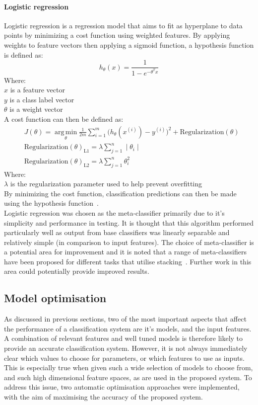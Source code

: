 \documentclass[titlepage, 12pt]{scrartcl} \usepackage{enumitem}
\DeclareMathOperator*{\argmin}{arg\,min}
\begin{document}
\paragraph{Logistic regression}
Logistic regression is a regression model that aims to fit as hyperplane to
data points by minimizing a cost function using weighted features.
By applying weights to feature vectors then applying a sigmoid function, a
hypothesis function is defined as:
\begin{equation}
    h_\theta(x)=\frac{1}{1-e^{-\theta^{T}x}}
\end{equation}
Where:\\
$x$ is a feature vector\\
$y$ is a class label vector \\
$\theta$ is a weight vector \\
A cost function can then be defined as:
\begin{align}
    &J(\theta)=\argmin\limits_\theta\frac{1}{2m}\sum\limits_{i=1}^m\Big(h_\theta(x^{(i)})-y^{(i)}\Big)^2+\text{Regularization}(\theta)\\
    &\text{Regularization}{(\theta)}_\text{L1}=\lambda\sum\limits_{j=1}^n\mid\theta_i\mid\\
    &\text{Regularization}{(\theta)}_\text{L2}=\lambda\sum\limits_{j=1}^n\theta_i^2
\end{align}
Where:\\
$\lambda$ is the regularization parameter used to help prevent overfitting\\
By minimizing the cost function, classification predictions can then be made
using the hypothesis function~\parencite{Ng2012}.\\
Logistic regression was chosen as the meta-classifier primarily due to it's
simplicity and performance in testing. It is thought that this algorithm
performed particularly well as output from base classifiers was linearly
separable and relatively simple (in comparison to input features). The choice of
meta-classifier is a potential area for improvement and it is noted that a
range of meta-classifiers have been proposed for different tasks that utilise
stacking~\parencite[p.29]{Sesmero2015}. Further work in this area could
potentially provide improved results.

\subsection{Model optimisation}\label{optimise}
As discussed in previous sections, two of the most important aspects that affect
the performance of a classification system are it's models, and the input
features. A combination of relevant features and well tuned models is therefore
likely to provide an accurate classification system. However, it is not always
immediately clear which values to choose for parameters, or which features to use as
inputs. This is especially true when given such a wide selection of models to
choose from, and such high dimensional feature spaces, as are used in the
proposed system. To address this issue, two automatic optimisation approaches
were implemented, with the aim of maximising the accuracy of the proposed
system.
\end{document}
